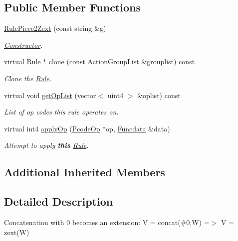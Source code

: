 \subsection*{Public Member Functions}
\begin{DoxyCompactItemize}
\item 
\mbox{\hyperlink{class_rule_piece2_zext_ac5cc0b69e54bb029f0ca6a425f88289f}{Rule\+Piece2\+Zext}} (const string \&g)
\begin{DoxyCompactList}\small\item\em \mbox{\hyperlink{class_constructor}{Constructor}}. \end{DoxyCompactList}\item 
virtual \mbox{\hyperlink{class_rule}{Rule}} $\ast$ \mbox{\hyperlink{class_rule_piece2_zext_ad383e6fe63af0ef65f4c9d5204e39dd5}{clone}} (const \mbox{\hyperlink{class_action_group_list}{Action\+Group\+List}} \&grouplist) const
\begin{DoxyCompactList}\small\item\em Clone the \mbox{\hyperlink{class_rule}{Rule}}. \end{DoxyCompactList}\item 
virtual void \mbox{\hyperlink{class_rule_piece2_zext_a10fb5ff85b1f1397eb17dc6c6fc47133}{get\+Op\+List}} (vector$<$ uint4 $>$ \&oplist) const
\begin{DoxyCompactList}\small\item\em List of op codes this rule operates on. \end{DoxyCompactList}\item 
virtual int4 \mbox{\hyperlink{class_rule_piece2_zext_aa879d79ce26d031791b5ae7a11908701}{apply\+Op}} (\mbox{\hyperlink{class_pcode_op}{Pcode\+Op}} $\ast$op, \mbox{\hyperlink{class_funcdata}{Funcdata}} \&data)
\begin{DoxyCompactList}\small\item\em Attempt to apply {\bfseries{this}} \mbox{\hyperlink{class_rule}{Rule}}. \end{DoxyCompactList}\end{DoxyCompactItemize}
\subsection*{Additional Inherited Members}


\subsection{Detailed Description}
Concatenation with 0 becomes an extension\+: {\ttfamily V = concat(\#0,W) =$>$ V = zext(\+W)} 

